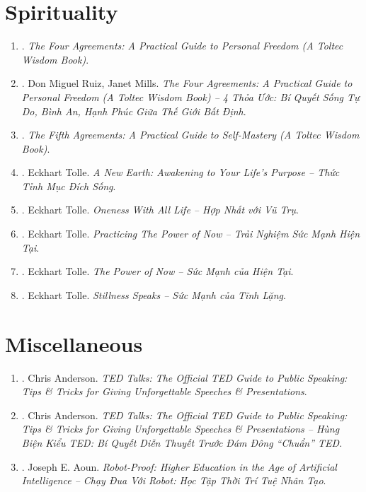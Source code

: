 \documentclass{article}
\begin{document}
\section{Spirituality}

\begin{enumerate}
	\item \cite{Ruiz2011}. \textit{The Four Agreements: A Practical Guide to Personal Freedom (A Toltec Wisdom Book)}.\hfill{}
	\item \cite{Ruiz_Mills2022}. Don Miguel Ruiz, Janet Mills. \textit{The Four Agreements: A Practical Guide to Personal Freedom (A Toltec Wisdom Book) -- 4 Thỏa Ước: Bí Quyết Sống Tự Do, Bình An, Hạnh Phúc Giữa Thế Giới Bất Định}.\hfill{}
	\item \cite{Ruiz_Ruiz2011}. \textit{The Fifth Agreements: A Practical Guide to Self-Mastery (A Toltec Wisdom Book)}.\hfill{}
	\item \cite{Tolle2021d}. Eckhart Tolle. \textit{A New Earth: Awakening to Your Life's Purpose -- Thức Tỉnh Mục Đích Sống}.\hfill{\sf[bought]}
	\item \cite{Tolle2021a}. Eckhart Tolle. \textit{Oneness With All Life -- Hợp Nhất với Vũ Trụ}.\hfill{}
	\item \cite{Tolle2021b}. Eckhart Tolle. \textit{Practicing The Power of Now -- Trải Nghiệm Sức Mạnh Hiện Tại}.\hfill{}
	\item \cite{Tolle2021c}. Eckhart Tolle. \textit{The Power of Now -- Sức Mạnh của Hiện Tại}.\hfill{\sf[bought]}
	\item \cite{Tolle2022}. Eckhart Tolle. \textit{Stillness Speaks -- Sức Mạnh của Tĩnh Lặng}.\hfill{}
\end{enumerate}


\section{Miscellaneous}

\begin{enumerate}
	\item \cite{Anderson2016}. Chris Anderson. \textit{TED Talks: The Official TED Guide to Public Speaking: Tips \& Tricks for Giving Unforgettable Speeches \& Presentations}.\hfill{\sf[downloaded]}
	\item \cite{Anderson2022}. Chris Anderson. \textit{TED Talks: The Official TED Guide to Public Speaking: Tips \& Tricks for Giving Unforgettable Speeches \& Presentations -- Hùng Biện Kiểu TED: Bí Quyết Diễn Thuyết Trước Đám Đông ``Chuẩn'' TED}.\\\mbox{}\hfill{}
	\item \cite{Aoun2019}. Joseph E. Aoun. \textit{Robot-Proof: Higher Education in the Age of Artificial Intelligence -- Chạy Đua Với Robot: Học Tập Thời Trí Tuệ Nhân Tạo}.\hfill{}
\end{enumerate}


\printbibliography[heading=bibintoc]
	
\end{document}
